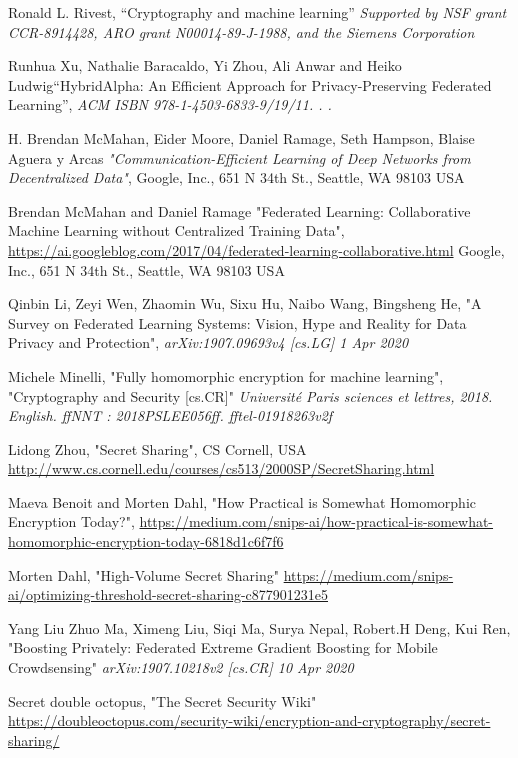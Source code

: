 \documentclass[conference]{IEEEtran}
\begin{document}
\begin{thebibliography}{1}

Ronald L. Rivest, ``Cryptography and machine learning'' \emph{Supported by NSF grant CCR-8914428, ARO grant N00014-89-J-1988, and the Siemens Corporation}

Runhua Xu, Nathalie Baracaldo, Yi Zhou, Ali Anwar and Heiko Ludwig``HybridAlpha: An Efficient Approach for Privacy-Preserving Federated Learning'', \emph {ACM ISBN 978-1-4503-6833-9/19/11. . .}

H. Brendan McMahan, Eider Moore, Daniel Ramage, Seth Hampson, Blaise Aguera y Arcas \emph{"Communication-Efficient Learning of Deep Networks from Decentralized Data"}, Google, Inc., 651 N 34th St., Seattle, WA 98103 USA

Brendan McMahan and Daniel Ramage "Federated Learning: Collaborative Machine Learning without Centralized Training Data", \url{https://ai.googleblog.com/2017/04/federated-learning-collaborative.html} Google, Inc., 651 N 34th St., Seattle, WA 98103 USA

Qinbin Li, Zeyi Wen, Zhaomin Wu, Sixu Hu, Naibo Wang, Bingsheng He, "A Survey on Federated Learning Systems: Vision, Hype and Reality for Data Privacy and Protection", \emph{arXiv:1907.09693v4 [cs.LG] 1 Apr 2020}

Michele Minelli, "Fully homomorphic encryption for machine learning", "Cryptography and Security
[cs.CR]"  \emph{Université Paris sciences et lettres, 2018. English. ffNNT : 2018PSLEE056ff. fftel-01918263v2f}

Lidong Zhou, "Secret Sharing", CS Cornell, USA
\url{http://www.cs.cornell.edu/courses/cs513/2000SP/SecretSharing.html}

Maeva Benoit and Morten Dahl, "How Practical is Somewhat Homomorphic Encryption Today?", \url{https://medium.com/snips-ai/how-practical-is-somewhat-homomorphic-encryption-today-6818d1c6f7f6}

Morten Dahl, "High-Volume Secret Sharing"
\url{https://medium.com/snips-ai/optimizing-threshold-secret-sharing-c877901231e5}

Yang Liu Zhuo Ma, Ximeng Liu, Siqi Ma, Surya Nepal, Robert.H Deng, Kui Ren, "Boosting Privately: Federated Extreme Gradient Boosting for Mobile Crowdsensing" \emph{arXiv:1907.10218v2 [cs.CR] 10 Apr 2020}

Secret double octopus, "The Secret Security Wiki"
\url{https://doubleoctopus.com/security-wiki/encryption-and-cryptography/secret-sharing/}


\end{thebibliography}
\end{document}
